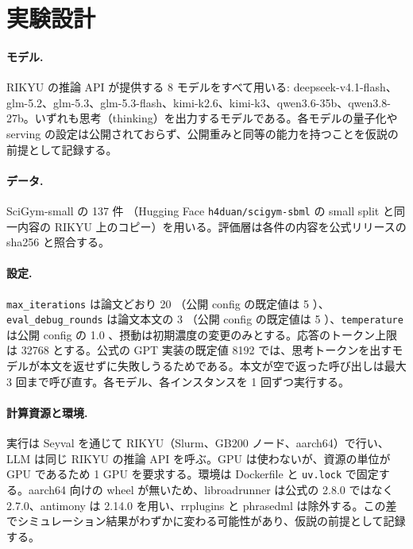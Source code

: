 \documentclass{article}
\begin{document}
\section{実験設計}
\label{sec:design}
\paragraph{モデル.}
RIKYU の推論 API が提供する 8 モデルをすべて用いる: deepseek-v4.1-flash、glm-5.2、glm-5.3、glm-5.3-flash、kimi-k2.6、kimi-k3、qwen3.6-35b、qwen3.8-27b。いずれも思考（thinking）を出力するモデルである。各モデルの量子化や serving の設定は公開されておらず、公開重みと同等の能力を持つことを仮説の前提として記録する。

\paragraph{データ.}
SciGym-small の 137 件 \cite[s1.p2]{duan-2025-measuring}（Hugging Face \texttt{h4duan/scigym-sbml} の small split と同一内容の RIKYU 上のコピー）を用いる。評価層は各件の内容を公式リリースの sha256 と照合する。

\paragraph{設定.}
\texttt{max\_iterations} は論文どおり 20 \cite[s1.p3]{duan-2025-measuring}（公開 config の既定値は 5 \cite[s2.p2]{h4duan-2025-scigym}）、\texttt{eval\_debug\_rounds} は論文本文の 3 \cite[s1.p4]{duan-2025-measuring}（公開 config の既定値は 5 \cite[s2.p3]{h4duan-2025-scigym}）、\texttt{temperature} は公開 config の 1.0 \cite[s2.p1]{h4duan-2025-scigym}、摂動は初期濃度の変更のみとする。応答のトークン上限は 32768 とする。公式の GPT 実装の既定値 8192 では、思考トークンを出すモデルが本文を返せずに失敗しうるためである。本文が空で返った呼び出しは最大 3 回まで呼び直す。各モデル、各インスタンスを 1 回ずつ実行する。

\paragraph{計算資源と環境.}
実行は Seyval を通じて RIKYU（Slurm、GB200 ノード、aarch64）で行い、LLM は同じ RIKYU の推論 API を呼ぶ。GPU は使わないが、資源の単位が GPU であるため 1 GPU を要求する。環境は Dockerfile と \texttt{uv.lock} で固定する。aarch64 向けの wheel が無いため、libroadrunner は公式の 2.8.0 ではなく 2.7.0、antimony は 2.14.0 を用い、rrplugins と phrasedml は除外する。この差でシミュレーション結果がわずかに変わる可能性があり、仮説の前提として記録する。
\end{document}

